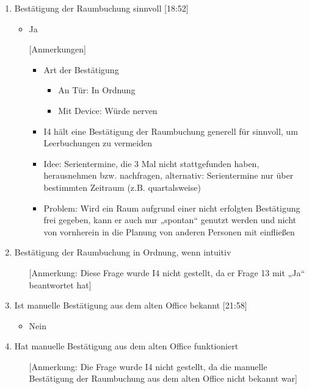 \begin{enumerate}
    \item Bestätigung der Raumbuchung sinnvoll [18:52]
    \begin{itemize}
        \item Ja
        \item[] [Anmerkungen]
        \begin{itemize}
            \item Art der Bestätigung
            \begin{itemize}
                \item An Tür: In Ordnung
                \item Mit Device: Würde nerven
            \end{itemize}
            \item I4 hält eine Bestätigung der Raumbuchung generell für sinnvoll, um Leerbuchungen zu vermeiden
            \item Idee: Serientermine, die 3 Mal nicht stattgefunden haben, herausnehmen bzw. nachfragen, alternativ: Serientermine nur über bestimmten Zeitraum (z.B. quartalsweise)
            \item Problem: Wird ein Raum aufgrund einer nicht erfolgten Bestätigung frei gegeben, kann er auch nur „spontan“ genutzt werden und nicht von vornherein in die Planung von anderen Personen mit einfließen
        \end{itemize}
    \end{itemize}
    
    \item Bestätigung der Raumbuchung in Ordnung, wenn intuitiv
    \begin{itemize}
        \item[] [Anmerkung: Diese Frage wurde I4 nicht gestellt, da er Frage 13 mit „Ja“ beantwortet hat]
    \end{itemize}
    
    \item Ist manuelle Bestätigung aus dem alten Office bekannt [21:58]
    \begin{itemize}
        \item Nein
    \end{itemize}
    
    \item Hat manuelle Bestätigung aus dem alten Office funktioniert
    \begin{itemize}
        \item[] [Anmerkung: Die Frage wurde I4 nicht gestellt, da die manuelle Bestätigung der Raumbuchung aus dem alten Office nicht bekannt war]
    \end{itemize}
    
\end{enumerate}

